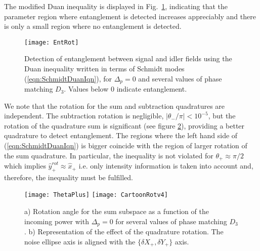 \documentclass[aps,prl,twocolumn,groupedaddress]{revtex4-1}
\begin{document}
The modified Duan inequality is displayed in Fig.~\ref{fig:DuanRotChi3}, indicating that the parameter region where entanglement is detected increases appreciably and there is only a small region where no entanglement is detected.
\begin{figure}[htb]
	\begin{center}
		\texttt{[image: EntRot]}
		\caption{Detection of entanglement between signal and idler fields using the Duan inequality written in terms of Schmidt modes (\ref{eqn:SchmidtDuanIqn}), for $\Delta_p=0$ and several values of phase matching $D_3$. Values below $0$ indicate entanglement.}
		\label{fig:DuanRotChi3}
	\end{center}
\end{figure} We note that the rotation for the sum and subtraction quadratures are independent. The subtraction rotation is negligible, $|\theta_-/\pi|<10^{-5}$, but the rotation of the quadrature sum is significant (see figure \ref{fig:ThetaPlus}), providing a better quadrature to detect entanglement. The regions where the left hand side of (\ref{eqn:SchmidtDuanIqn}) is bigger coincide with the region of larger rotation of the sum quadrature. In particular, the inequality is not violated for $\theta_+\approx\pi/2$ which implies $\hat{y}^{rot}_+\approx\hat{x}_+$ i.e. only intensity information is taken into account and, therefore, the inequality must be fulfilled.
\begin{figure}[htbp]
	\begin{center}
		\texttt{[image: ThetaPlus]}
		\texttt{[image: CartoonRotv4]}
		\caption{ a) Rotation angle for the sum subspace as a function of the incoming power with $\Delta_p=0$ for several values of phase matching $D_3$. b) Representation of the effect of the quadrature rotation. The noise ellipse axis is aligned with the $\{\delta X_+,\delta Y_+\}$ axis.}
		\label{fig:ThetaPlus}
	\end{center}
\end{figure}
\end{document}
